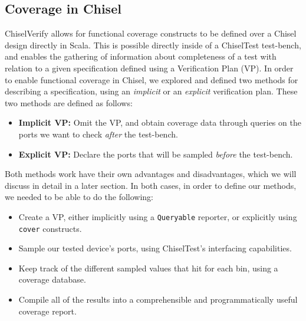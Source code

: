 \documentclass[conference]{IEEEtran}
\begin{document}

\subsection{Coverage in Chisel}
ChiselVerify allows for functional coverage constructs to be defined over a Chisel design directly in Scala. 
This is possible directly inside of a ChiselTest test-bench, and enables the gathering of information about completeness of a test with relation to a given specification defined using a Verification Plan (VP).
In order to enable functional coverage in Chisel, we explored and defined two methods for describing a specification, using an \emph{implicit} or an \emph{explicit} verification plan.
These two methods are defined as follows:

\begin{itemize}
	\item \textbf{Implicit VP:} Omit the VP, and obtain coverage data through queries on the ports we want to check \emph{after} the test-bench.
	\item \textbf{Explicit VP:} Declare the ports that will be sampled \emph{before} the test-bench.
\end{itemize}

Both methods work have their own advantages and disadvantages, which we will discuss in detail in a later section.
In both cases, in order to define our methods, we needed to be able to do the following:

\begin{itemize}
  \item Create a VP, either implicitly using a \texttt{Queryable} reporter, or explicitly using \texttt{cover} constructs.
  \item Sample our tested device's ports, using ChiselTest's interfacing capabilities.
  \item Keep track of the different sampled values that hit for each bin, using a coverage database.
  \item Compile all of the results into a comprehensible and programmatically useful coverage report.
\end{itemize}
\end{document}
